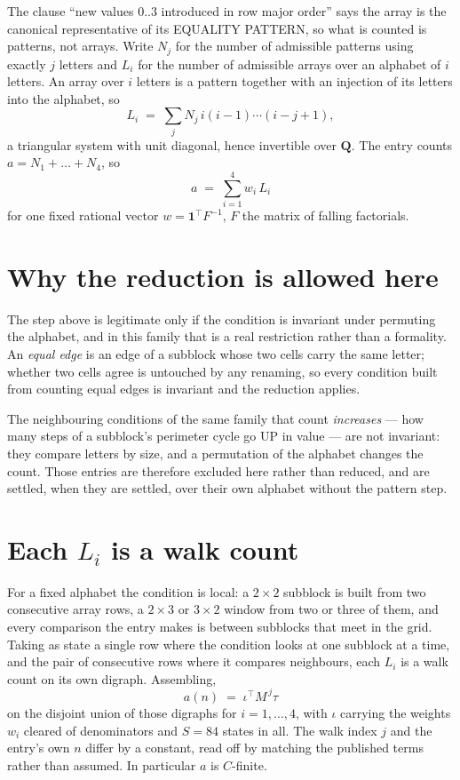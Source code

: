 \documentclass[11pt,a4paper]{article}
\theoremstyle{plain}
\theoremstyle{definition}
\begin{document}
The clause ``new values $0..3$ introduced in row major order'' says the array is the
canonical representative of its EQUALITY PATTERN, so what is counted is patterns, not arrays.
Write $N_j$ for the number of admissible patterns using exactly $j$ letters and $L_i$ for the
number of admissible arrays over an alphabet of $i$ letters. An array over $i$ letters is a
pattern together with an injection of its letters into the alphabet, so
\[
L_i\;=\;\sum_j N_j\,i(i-1)\cdots(i-j+1),
\]
a triangular system with unit diagonal, hence invertible over $\mathbf{Q}$. The entry counts
$a=N_1+\dots+N_{4}$, so
\[
a\;=\;\sum_{i=1}^{4}w_i\,L_i
\]
for one fixed rational vector $w=\mathbf{1}^{\!\top}F^{-1}$, $F$ the matrix of falling
factorials.

\section{Why the reduction is allowed here}

The step above is legitimate only if the condition is invariant under permuting the alphabet,
and in this family that is a real restriction rather than a formality. An \emph{equal edge}
is an edge of a subblock whose two cells carry the same letter; whether two cells agree is
untouched by any renaming, so every condition built from counting equal edges is invariant and
the reduction applies.

The neighbouring conditions of the same family that count \emph{increases} --- how many steps
of a subblock's perimeter cycle go UP in value --- are not invariant: they compare letters by
size, and a permutation of the alphabet changes the count. Those entries are therefore excluded
here rather than reduced, and are settled, when they are settled, over their own alphabet
without the pattern step.

\section{Each $L_i$ is a walk count}

For a fixed alphabet the condition is local: a $2\times2$ subblock is built from two
consecutive array rows, a $2\times3$ or $3\times2$ window from two or three of them, and every
comparison the entry makes is between subblocks that meet in the grid. Taking as state a single
row where the condition looks at one subblock at a time, and the pair of consecutive rows where
it compares neighbours, each $L_i$ is a walk count on its own digraph. Assembling,
\[
a(n)\;=\;\iota^{\!\top}M^{\,j}\tau
\]
on the disjoint union of those digraphs for $i=1,\dots,4$, with $\iota$ carrying the weights
$w_i$ cleared of denominators and $S=84$ states in all. The walk index $j$ and the entry's own
$n$ differ by a constant, read off by matching the published terms rather than assumed. In
particular $a$ is $C$-finite.
\end{document}
